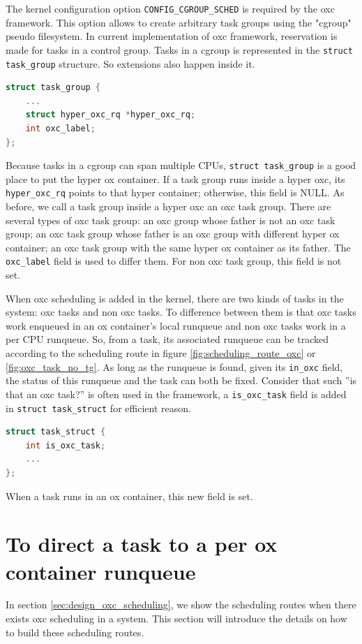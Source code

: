 The kernel configuration option \texttt{CONFIG\_CGROUP\_SCHED} is required
by the oxc framework. This option allows to create arbitrary task groups
using the "cgroup" pseudo filesystem. In current implementation of oxc 
framework, reservation is made for tasks in a control group. Tasks in a 
cgroup is represented in the \texttt{struct task\_group} structure. So 
extensions also happen inside it.
\begin{lstlisting}[language=C, caption={Extensions in 
						\texttt{struct task\_group}}]
struct task_group {
	...
	struct hyper_oxc_rq *hyper_oxc_rq;
	int oxc_label;
};
\end{lstlisting}
Because tasks in a cgroup can span multiple CPUs, \texttt{struct task\_group}
is a good place to put the hyper ox container.
If a task group runs inside a hyper oxc, its \texttt{hyper\_oxc\_rq} points 
to that hyper container; otherwise, this field is NULL. As before, we call
a task group inside a hyper oxc an oxc task group.
There are several types of oxc task group: an oxc group whose father
is not an oxc task group; an oxc task group whose father is an oxc group
with different hyper ox container; an oxc task group with the same hyper
ox container as its father. The \texttt{oxc\_label} field is used to 
differ them. For non oxc task group, this field is not set.

When oxc scheduling is added in the kernel, there are two kinds of tasks
in the system: oxc tasks and non oxc tasks. To difference between them
is that oxc tasks work enqueued in an ox container's local runqueue and 
non oxc tasks work in a per CPU runqueue. So, from a task, its 
associated runqueue can be tracked according to the scheduling route in
figure \ref{fig:scheduling_route_oxc} or \ref{fig:oxc_task_no_tg}.
As long as the runqueue is found, given its \texttt{in\_oxc} field, the 
status of this runqueue and the task can both be fixed.
Consider that such ''is that an oxc task?'' is often used in the framework, 
a \texttt{is\_oxc\_task} field is added in \texttt{struct task\_struct} for 
efficient reason.
\begin{lstlisting}[language=C, caption={\texttt{is\_oxc\_task} field in 
						\texttt{struct task\_struct}}]
struct task_struct {
	int is_oxc_task;
	...
};
\end{lstlisting}
When a task runs in an ox container, this new field is set.

\section{To direct a task to a per ox container runqueue}
In section \ref{sec:design_oxc_scheduling}, we show the scheduling routes
when there exists oxc scheduling in a system. This section will introduce
the details on how to build these scheduling routes.
